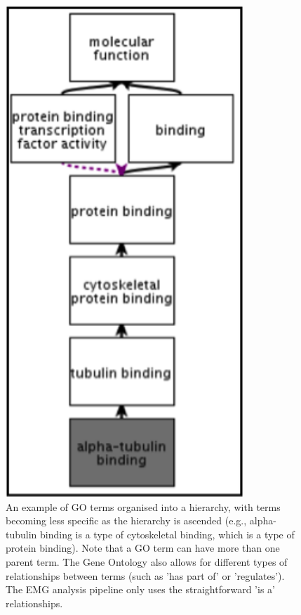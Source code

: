 \begin{figure}[Figure 2]
\centering
\includegraphics[width=0.8\textwidth]{handout/GO.png}
\caption{An example of GO terms organised into a hierarchy, with terms becoming less specific as the hierarchy is ascended (e.g., alpha-tubulin binding is a type of cytoskeletal binding, which is a type of protein binding). Note that a GO term can have more than one parent term. The Gene Ontology also allows for different types of relationships between terms (such as 'has part of' or 'regulates'). The EMG analysis pipeline only uses the straightforward 'is a' relationships.}
\label{fig:GO}
\end{figure}

